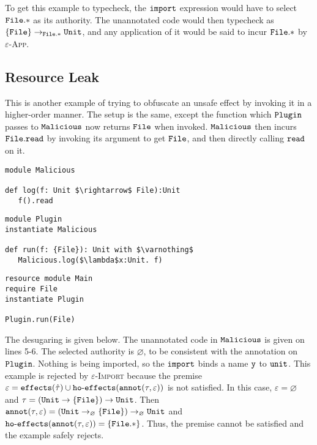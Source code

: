 To get this example to typecheck, the $\mathtt{import}$ expression would have to select $\mathtt{File.*}$ as its authority. The unannotated code would then typecheck as $\mathtt{ \{ File \} \rightarrow_{\mathtt{File.*}} Unit }$, and any application of it would be said to incur $\mathtt{ File.* }$ by \textsc{$\varepsilon$-App}.





























\subsection{Resource Leak}

This is another example of trying to obfuscate an unsafe effect by invoking it in a higher-order manner. The setup is the same, except the function which $\mathtt{Plugin}$ passes to $\mathtt{Malicious}$ now returns $\mathtt{File}$ when invoked. $\mathtt{Malicious}$ then incurs $\mathtt{File.read}$ by invoking its argument to get $\mathtt{File}$, and then directly calling $\mathtt{read}$ on it.

\begin{lstlisting}
module Malicious

def log(f: Unit $\rightarrow$ File):Unit
   f().read
\end{lstlisting}

\begin{lstlisting}
module Plugin
instantiate Malicious

def run(f: {File}): Unit with $\varnothing$
   Malicious.log($\lambda$x:Unit. f)
\end{lstlisting}

\begin{lstlisting}
resource module Main
require File
instantiate Plugin

Plugin.run(File)
\end{lstlisting}

The desugaring is given below. The unannotated code in $\mathtt{Malicious}$ is given on lines 5-6. The selected authority is $\varnothing$, to be consistent with the annotation on $\mathtt{Plugin}$. Nothing is being imported, so the $\mathtt{import}$ binds a name $\mathtt{y}$ to $\mathtt{unit}$. This example is rejected by \textsc{$\varepsilon$-Import} because the premise $\varepsilon = \mathtt{effects}(\hat \tau) \cup \mathtt{ho \hbox{-} effects}(\mathtt{annot}(\tau, \varepsilon))$ is not satisfied. In this case, $\varepsilon = \varnothing$ and $\tau = \mathtt{ (Unit \rightarrow \{ File \}) \rightarrow Unit }$. Then $\mathtt{annot}(\tau, \varepsilon) = \mathtt{ (Unit \rightarrow_{\varnothing} \{ File \}) \rightarrow_{\varnothing} Unit }$ and $\mathtt{ho \hbox{-} effects}(\mathtt{annot}(\tau, \varepsilon)) = \{ \mathtt{File.*} \}$. Thus, the premise cannot be satisfied and the example safely rejects.


